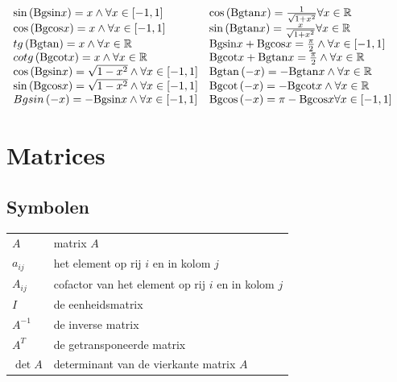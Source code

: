 \documentclass[a5paper]{article}
\begin{document}
$\begin{array}{*{20}{l}}
{\sin \left( {{\mathop{\rm Bgsin}\nolimits} x} \right) = x \wedge \forall x \in \left[ { - 1,1} \right]}&{\cos \left( {{\mathop{\rm Bgtan}\nolimits} x} \right) = \frac{1}{{\sqrt {1 + {x^2}} }}\forall x \in \mathbb {R} }\\
{\cos \left( {{\mathop{\rm Bgcos}\nolimits} x} \right) = x \wedge \forall x \in \left[ { - 1,1} \right]}&{\sin \left( {{\mathop{\rm Bgtan}\nolimits} x} \right) = \frac{x}{{\sqrt {1 + {x^2}} }}\forall x \in \mathbb {R} }\\
{tg\left( {{\mathop{\rm Bgtan}\nolimits} } \right) = x \wedge \forall x \in \mathbb {R} }&{{\mathop{\rm Bgsin}\nolimits} x + {\mathop{\rm Bgcos}\nolimits} x = \frac{\pi }{2} \wedge \forall x \in \left[ { - 1,1} \right]}\\
{cotg\left( {{\mathop{\rm Bgcot}\nolimits} x} \right) = x \wedge \forall x \in \mathbb {R} }&{{\mathop{\rm Bgcot}\nolimits} x + {\mathop{\rm Bgtan}\nolimits} x = \frac{\pi }{2} \wedge \forall x \in \mathbb {R} }\\
{\cos \left( {{\mathop{\rm Bgsin}\nolimits} x} \right) = \sqrt {1 - {x^2}} \wedge \forall x \in \left[ { - 1,1} \right]}&{{\mathop{\rm Bgtan}\nolimits} \left( { - x} \right) =  - {\mathop{\rm Bgtan}\nolimits} x \wedge \forall x \in \mathbb {R} }\\
{\sin \left( {{\mathop{\rm Bgcos}\nolimits} x} \right) = \sqrt {1 - {x^2}}  \wedge\forall x \in \left[ { - 1,1} \right]}&{{\mathop{\rm Bgcot}\nolimits} \left( { - x} \right) =  - {\mathop{\rm Bgcot}\nolimits} x \wedge \forall x \in \mathbb {R} }\\
{Bgsin\left( { - x} \right) =  - {\mathop{\rm Bgsin}\nolimits} x \wedge \forall x \in \left[ { - 1,1} \right]}&{{\mathop{\rm Bgcos}\nolimits} \left( { - x} \right) = \pi  - {\mathop{\rm Bgcos}\nolimits} x\forall x \in \left[ { - 1,1} \right]}
\end{array}$

\newpage

\section{Matrices}
\subsection{Symbolen}

\begingroup
\renewcommand{\arraystretch}{1.2}
\begin{tabular}{ll}
$A$        & matrix $A$ \\
$a_{ij}$   & het element op rij $i$ en in kolom $j$ \\
$A_{ij}$   & cofactor van het element op rij $i$ en in kolom $j$ \\
$I$        & de eenheidsmatrix \\
$A^{-1}$   & de inverse matrix \\
$A^{T}$    & de getransponeerde matrix \\
$\det A$   & determinant van de vierkante matrix $A$
\end{tabular}
\endgroup
\end{document}
